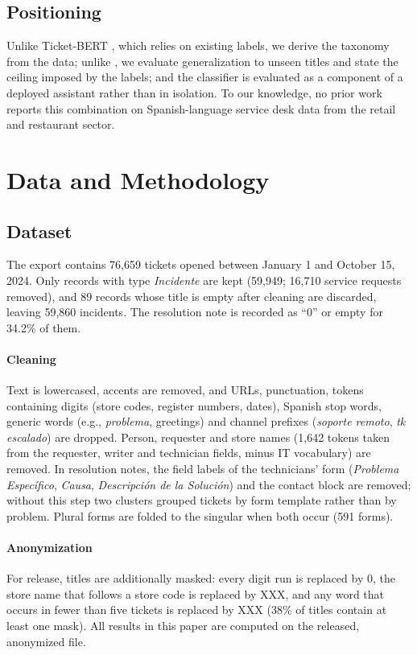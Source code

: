 \documentclass[conference]{IEEEtran}
\begin{document}
\subsection{Positioning}
Unlike Ticket-BERT \cite{liu2023ticketbert}, which relies on existing labels, we derive the taxonomy from the
data; unlike \cite{revina2020,razma2026}, we evaluate generalization to unseen titles and state the ceiling
imposed by the labels; and the classifier is evaluated as a component of a deployed assistant rather than
in isolation. To our knowledge, no prior work reports this combination on Spanish-language service desk
data from the retail and restaurant sector.

\section{Data and Methodology}

\subsection{Dataset}
The export contains 76,659 tickets opened between January 1 and October 15, 2024. Only records with type
\emph{Incidente} are kept (59,949; 16,710 service requests removed), and 89 records whose title is empty after
cleaning are discarded, leaving 59,860 incidents. The resolution note is recorded as ``0'' or empty for 34.2\%
of them.

\paragraph{Cleaning} Text is lowercased, accents are removed, and URLs, punctuation, tokens containing
digits (store codes, register numbers, dates), Spanish stop words, generic words (e.g., \emph{problema},
greetings) and channel prefixes (\emph{soporte remoto}, \emph{tk escalado}) are dropped. Person, requester and
store names (1,642 tokens taken from the requester, writer and technician fields, minus IT vocabulary) are
removed. In resolution notes, the field labels of the technicians' form (\emph{Problema Específico},
\emph{Causa}, \emph{Descripción de la Solución}) and the contact block are removed; without this step two
clusters grouped tickets by form template rather than by problem. Plural forms are folded to the singular when
both occur (591 forms).

\paragraph{Anonymization} For release, titles are additionally masked: every digit run is replaced by 0, the
store name that follows a store code is replaced by XXX, and any word that occurs in fewer than five tickets
is replaced by XXX (38\% of titles contain at least one mask). All results in this paper are computed on the
released, anonymized file.
\end{document}
